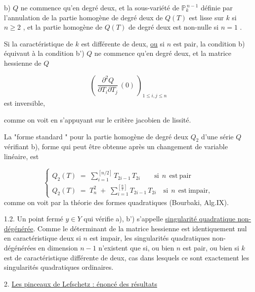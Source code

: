 b) $Q$ ne commence qu'en degré deux, et la sous-variété de $\mathbb{P}^{\,n-1}_k$ définie par l'annulation de la partie homogène de degré deux de $Q(T)$ est lisse sur $k$ si $n \geq 2$ , et la partie homogène de $Q(T)$ de degré deux est non-nulle si $n = 1$ .

Si la caractéristique de $k$ est différente de deux, \underline{ou} si $n$ est pair, la condition b) équivaut à la condition
b') $Q$ ne commence qu'en degré deux, et la matrice hessienne de $Q$

\begin{equation*}
\left(\ \frac{\partial^2 Q}{\partial T_i \partial T_j}\,(0)\ \right)_{1 \leq i,j \leq n}
\end{equation*}
est inversible,

comme on voit en s'appuyant sur le critère jacobien de lissité.

La  "forme standard "  pour la partie homogène de degré deux $Q_2$ d'une série $Q$ vérifiant b), forme qui peut être obtenue après un changement de variable linéaire, est

\begin{equation}\tag{1.1.1}
\left\{
\begin{array}{l}
Q_2(T) \;=\; \displaystyle\sum_{i=1}^{[n/2]} T_{2i-1}\, T_{2i} \qquad \mathrm{si}\ \ n\ \ \mathrm{est\ pair} \\[4ex]
Q_2(T) \;=\; T_n^2 \;+\; \displaystyle\sum_{i=1}^{\left[\frac{n}{2}\right]} T_{2i-1}\, T_{2i} \quad \mathrm{si}\ \ n\ \ \mathrm{est\ impair,}
\end{array}
\right.
\end{equation}
comme on voit par la théorie des formes quadratiques (Bourbaki, Alg.IX).

1.2.    Un point fermé $y \in Y$ qui vérifie a), b') s'appelle \underline{singularité quadratique non-dégénérée}. Comme le déterminant de la matrice hessienne est identiquement nul en caractéristique deux si $n$ est impair, les singularités quadratiques non-dégénérées en dimension $n-1$ n'existent que si, ou bien $n$ est pair, ou bien si $k$ est de caractéristique différente de deux, cas dans lesquels ce sont exactement les singularités quadratiques ordinaires.




2. \underline{Les pinceaux de Lefschetz : énoncé des résultats}

